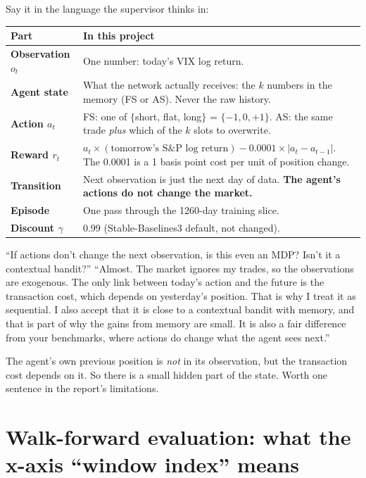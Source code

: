 \documentclass[11pt,a4paper]{article}
\begin{document}
Say it in the language the supervisor thinks in:

\begin{longtable}{>{\bfseries}p{3cm} p{11.8cm}}
\toprule
Part & In this project \\
\midrule
Observation $o_t$ & One number: today's VIX log return. \\
Agent state & What the network actually receives: the $k$ numbers in the memory
  (FS or AS). Never the raw history. \\
Action $a_t$ & FS: one of $\{$short, flat, long$\}$ = $\{-1, 0, +1\}$. AS: the same trade
  \emph{plus} which of the $k$ slots to overwrite. \\
Reward $r_t$ & $a_t \times (\text{tomorrow's S\&P log return}) - 0.0001 \times
  |a_t - a_{t-1}|$. The 0.0001 is a 1 basis point cost per unit of position change. \\
Transition & Next observation is just the next day of data. \textbf{The agent's actions do
  not change the market.} \\
Episode & One pass through the 1260-day training slice. \\
Discount $\gamma$ & 0.99 (Stable-Baselines3 default, not changed). \\
\bottomrule
\end{longtable}

\begin{qa}{``If actions don't change the next observation, is this even an MDP? Isn't it a
contextual bandit?''}
``Almost. The market ignores my trades, so the observations are exogenous. The only link
between today's action and the future is the transaction cost, which depends on yesterday's
position. That is why I treat it as sequential. I also accept that it is close to a
contextual bandit with memory, and that is part of why the gains from memory are small.
It is also a fair difference from your benchmarks, where actions do change what the agent
sees next.''
\end{qa}

\begin{honest}
The agent's own previous position is \emph{not} in its observation, but the transaction cost
depends on it. So there is a small hidden part of the state. Worth one sentence in the
report's limitations.
\end{honest}

\section{Walk-forward evaluation: what the x-axis ``window index'' means}
\end{document}
